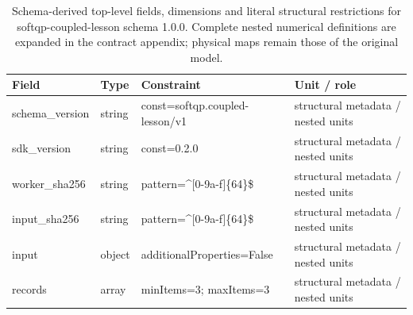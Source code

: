 \begin{table}[htbp]\centering\footnotesize
\caption{Schema-derived top-level fields, dimensions and literal structural restrictions for softqp-coupled-lesson schema 1.0.0. Complete nested numerical definitions are expanded in the contract appendix; physical maps remain those of the original model.}\label{tab:contract-softqp-coupled-lesson}
\begin{tabularx}{\textwidth}{@{}>{\raggedright\arraybackslash}p{}>{\raggedright\arraybackslash}p{}>{\raggedright\arraybackslash}X>{\raggedright\arraybackslash}X@{}}\toprule
Field & Type & Constraint & Unit / role\\\midrule
schema\_\allowbreak{}version & string & const=\allowbreak{}softqp.\allowbreak{}coupled-\allowbreak{}lesson/\allowbreak{}v1 & structural metadata /\allowbreak{} nested units\\
sdk\_\allowbreak{}version & string & const=\allowbreak{}0.\allowbreak{}2.\allowbreak{}0 & structural metadata /\allowbreak{} nested units\\
worker\_\allowbreak{}sha256 & string & pattern=\allowbreak{}\textasciicircum{}[0-9a-\allowbreak{}f]\{64\}\$ & structural metadata /\allowbreak{} nested units\\
input\_\allowbreak{}sha256 & string & pattern=\allowbreak{}\textasciicircum{}[0-9a-\allowbreak{}f]\{64\}\$ & structural metadata /\allowbreak{} nested units\\
input & object & additionalProperties=\allowbreak{}False & structural metadata /\allowbreak{} nested units\\
records & array & minItems=\allowbreak{}3; maxItems=\allowbreak{}3 & structural metadata /\allowbreak{} nested units\\
\bottomrule\end{tabularx}
\end{table}
